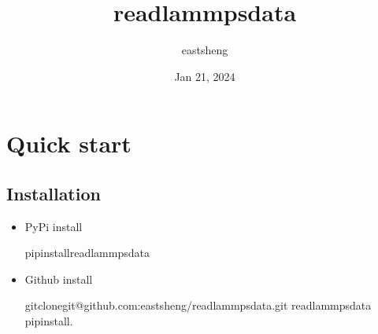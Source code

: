 \documentclass[letterpaper,10pt,english]{sphinxmanual}
\title{readlammpsdata}
\date{Jan 21, 2024}
\author{eastsheng}
\begin{document}
\pagestyle{empty}
\sphinxmaketitle
\pagestyle{plain}
\sphinxtableofcontents
\pagestyle{normal}
\label{\detokenize{index::doc}}


\sphinxstepscope


\chapter{Quick start}
\label{\detokenize{quick_start:quick-start}}\label{\detokenize{quick_start::doc}}

\section{Installation}
\label{\detokenize{quick_start:installation}}\begin{itemize}
\item {} 
\sphinxAtStartPar
PyPi install

\begin{sphinxVerbatim}[commandchars=\\\{\}]
pipinstallreadlammpsdata
\end{sphinxVerbatim}

\item {} 
\sphinxAtStartPar
Github install

\begin{sphinxVerbatim}[commandchars=\\\{\}]
gitclonegit@github.com:eastsheng/readlammpsdata.git
readlammpsdata
pipinstall.
\end{sphinxVerbatim}

\end{itemize}
\end{document}
